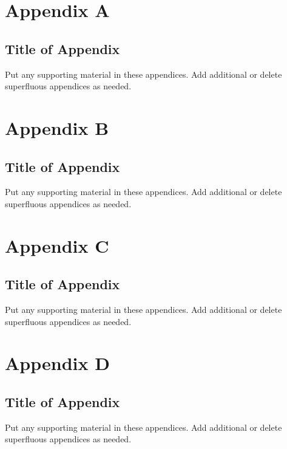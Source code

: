 \documentclass[12pt]{report}
\begin{document}
\appendix
\chapter{Appendix A}
\section*{Title of Appendix}
Put any supporting material in these appendices. Add additional or delete superfluous appendices as needed.

\chapter{Appendix B}
\section*{Title of Appendix}
Put any supporting material in these appendices. Add additional or delete superfluous appendices as needed.

\chapter{Appendix C}
\section*{Title of Appendix}
Put any supporting material in these appendices. Add additional or delete superfluous appendices as needed.

\chapter{Appendix D}
\section*{Title of Appendix}
Put any supporting material in these appendices. Add additional or delete superfluous appendices as needed.
\end{document}
